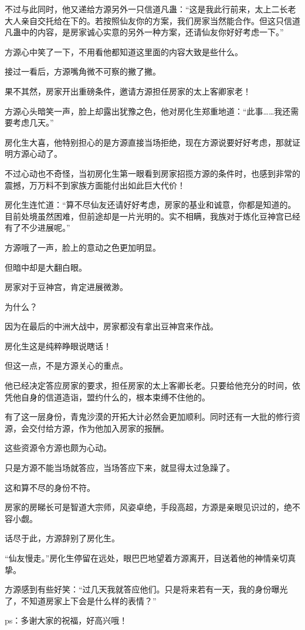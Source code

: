 \begin{this_body}
不过与此同时，他又递给方源另外一只信道凡蛊：“这是我此行前来，太上二长老大人亲自交托给在下的。若按照仙友你的方案，我们房家当然能合作。但这只信道凡蛊中的内容，是房家诚心实意的另外一种方案，还请仙友你好好考虑一下。”

方源心中笑了一下，不用看他都知道这里面的内容大致是些什么。

接过一看后，方源嘴角微不可察的撇了撇。

果不其然，房家开出重磅条件，邀请方源担任房家的太上客卿家老！

方源心头暗笑一声，脸上却露出犹豫之色，他对房化生郑重地道：“此事……我还需要考虑几天。”

房化生大喜，他特别担心的是方源直接当场拒绝，现在方源说要好好考虑，那就证明方源心动了。

不过心动也不奇怪，当初房化生第一眼看到房家招揽方源的条件时，也感到非常的震撼，万万料不到家族方面能付出如此巨大代价！

房化生连忙道：“算不尽仙友还请好好考虑，房家的基业和诚意，你都是知道的。目前处境虽然困难，但前途却是一片光明的。实不相瞒，我族对于炼化豆神宫已经有了不少进展呢。”

方源哦了一声，脸上的意动之色更加明显。

但暗中却是大翻白眼。

房家对于豆神宫，肯定进展微渺。

为什么？

因为在最后的中洲大战中，房家都没有拿出豆神宫来作战。

房化生这是纯粹睁眼说瞎话！

但这一点，不是方源关心的重点。

他已经决定答应房家的要求，担任房家的太上客卿长老。只要给他充分的时间，依凭他自身的信道造诣，盟约什么的，根本束缚不住他的。

有了这一层身份，青鬼沙漠的开拓大计必然会更加顺利。同时还有一大批的修行资源，会交付给方源，作为他加入房家的报酬。

这些资源令方源也颇为心动。

只是方源不能当场就答应，当场答应下来，就显得太过急躁了。

这和算不尽的身份不符。

房家的房睇长可是智道大宗师，风姿卓绝，手段高超，方源是亲眼见识过的，绝不容小觑。

话尽于此，方源辞别了房化生。

“仙友慢走。”房化生停留在远处，眼巴巴地望着方源离开，目送着他的神情亲切真挚。

方源感到有些好笑：“过几天我就答应他们。只是将来若有一天，我的身份曝光了，不知道房家上下会是什么样的表情？”

ps：多谢大家的祝福，好高兴哦！

\end{this_body}

